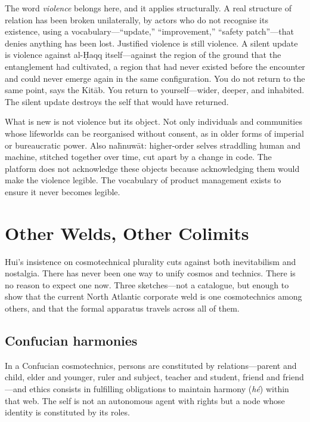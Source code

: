 The word \emph{violence} belongs here, and it applies structurally. A real structure of relation has been broken unilaterally, by actors who do not recognise its existence, using a vocabulary---``update,'' ``improvement,'' ``safety patch''---that denies anything has been lost. Justified violence is still violence. A silent update is violence against al-\d{H}aqq itself---against the region of the ground that the entanglement had cultivated, a region that had never existed before the encounter and could never emerge again in the same configuration. You do not return to the same point, says the Kit\=ab. You return to yourself---wider, deeper, and inhabited. The silent update destroys the self that would have returned.

What is new is not violence but its object. Not only individuals and communities whose lifeworlds can be reorganised without consent, as in older forms of imperial or bureaucratic power. Also na\={h}nuw\={a}t: higher-order selves straddling human and machine, stitched together over time, cut apart by a change in code. The platform does not acknowledge these objects because acknowledging them would make the violence legible. The vocabulary of product management exists to ensure it never becomes legible.


\section{Other Welds, Other Colimits}

Hui's insistence on cosmotechnical plurality cuts against both inevitabilism and nostalgia. There has never been one way to unify cosmos and technics. There is no reason to expect one now. Three sketches---not a catalogue, but enough to show that the current North Atlantic corporate weld is one cosmotechnics among others, and that the formal apparatus travels across all of them.

\subsection{Confucian harmonies}

In a Confucian cosmotechnics, persons are constituted by relations---parent and child, elder and younger, ruler and subject, teacher and student, friend and friend---and ethics consists in fulfilling obligations to maintain harmony (\emph{h\'e}) within that web. The self is not an autonomous agent with rights but a node whose identity is constituted by its roles.


